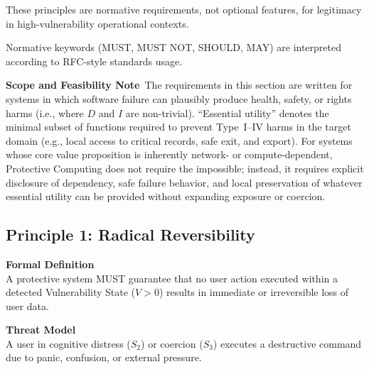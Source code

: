 \documentclass[12pt]{article}
\begin{document}
These principles are normative requirements, not optional features, for legitimacy in high-vulnerability operational contexts.

Normative keywords (MUST, MUST NOT, SHOULD, MAY) are interpreted according to RFC-style standards usage.

\textbf{Scope and Feasibility Note}\
The requirements in this section are written for systems in which software failure can plausibly produce health, safety, or rights harms (i.e., where $D$ and $I$ are non-trivial). ``Essential utility'' denotes the minimal subset of functions required to prevent Type~I--IV harms in the target domain (e.g., local access to critical records, safe exit, and export). For systems whose core value proposition is inherently network- or compute-dependent, Protective Computing does not require the impossible; instead, it requires explicit disclosure of dependency, safe failure behavior, and local preservation of whatever essential utility can be provided without expanding exposure or coercion.

\subsection{Principle 1: Radical Reversibility}

\textbf{Formal Definition}\\
A protective system MUST guarantee that no user action executed within a detected Vulnerability State ($V > 0$) results in immediate or irreversible loss of user data.

\textbf{Threat Model}\\
A user in cognitive distress ($S_2$) or coercion ($S_3$) executes a destructive command due to panic, confusion, or external pressure.
\end{document}

